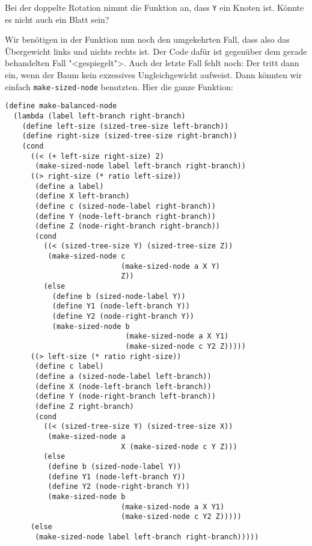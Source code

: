 %
\begin{aufgabeinline}
  Bei der doppelte Rotation nimmt die Funktion an, dass \lstinline{Y}
  ein Knoten ist.  Könnte es nicht auch ein Blatt sein?
\end{aufgabeinline}
%
Wir benötigen in der Funktion nun noch den umgekehrten Fall, dass also
das Übergewicht links und nichts rechts ist.  Der Code dafür ist
gegenüber dem gerade behandelten Fall "<gespiegelt">.  Auch der letzte
Fall fehlt noch: Der tritt dann ein,  wenn der Baum kein exzessives
Ungleichgewicht aufweist.  Dann könnten wir einfach
\lstinline{make-sized-node} benutzten.  Hier die ganze Funktion:\label{func:make-balanced-node}
%
\begin{lstlisting}
(define make-balanced-node
  (lambda (label left-branch right-branch)
    (define left-size (sized-tree-size left-branch))
    (define right-size (sized-tree-size right-branch))
    (cond
      ((< (+ left-size right-size) 2)
       (make-sized-node label left-branch right-branch))
      ((> right-size (* ratio left-size))
       (define a label)
       (define X left-branch)
       (define c (sized-node-label right-branch))
       (define Y (node-left-branch right-branch))
       (define Z (node-right-branch right-branch))
       (cond
         ((< (sized-tree-size Y) (sized-tree-size Z))
          (make-sized-node c
                           (make-sized-node a X Y)
                           Z))
         (else
           (define b (sized-node-label Y))
           (define Y1 (node-left-branch Y))
           (define Y2 (node-right-branch Y))
           (make-sized-node b
                            (make-sized-node a X Y1)
                            (make-sized-node c Y2 Z)))))
      ((> left-size (* ratio right-size))
       (define c label)
       (define a (sized-node-label left-branch))
       (define X (node-left-branch left-branch))
       (define Y (node-right-branch left-branch))
       (define Z right-branch)
       (cond
         ((< (sized-tree-size Y) (sized-tree-size X))
          (make-sized-node a
                           X (make-sized-node c Y Z)))
         (else
          (define b (sized-node-label Y))
          (define Y1 (node-left-branch Y))
          (define Y2 (node-right-branch Y))
          (make-sized-node b
                           (make-sized-node a X Y1)
                           (make-sized-node c Y2 Z)))))
      (else
       (make-sized-node label left-branch right-branch)))))
\end{lstlisting}
%

